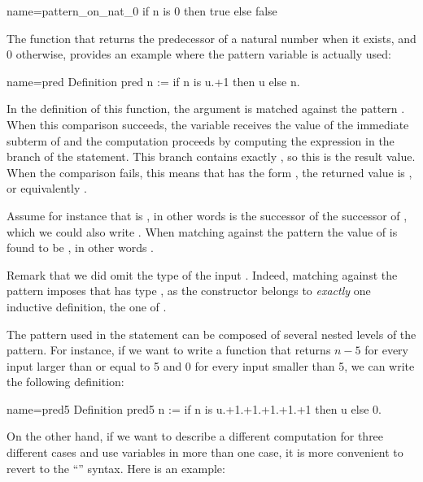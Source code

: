\begin{coq}{name=pattern_on_nat_0}{}
if n is 0 then true else false
\end{coq}

The  function that returns the predecessor of a natural number
when it exists, and 0 otherwise, provides an example where the pattern
variable is actually used:

\begin{coq}{name=pred}{}
Definition pred n := if n is u.+1 then u else n.
\end{coq}

In the definition of this function, the argument  is
matched against the pattern .  When this comparison
succeeds, the variable  receives the value of the immediate
subterm of  and the computation proceeds by computing the expression
in the  branch of the  statement.  This branch contains
exactly , so this is the result value.  When the comparison
fails, this means that  has the form , the returned value is
, or equivalently .

Assume for instance that  is , in other words  is the
successor of the successor of , which we could also write
.  When matching  against the pattern 
the value of  is found to be , in other words .

Remark that we did omit the type of the input . Indeed, matching
 against  the  pattern imposes that  has type
, as the  constructor belongs to \emph{exactly}
one inductive definition, the one of .

The pattern used in the  statement can be composed of
several nested levels of the  pattern.  For instance,
if we want to write a function
that returns \(n-5\) for every input larger than or equal to 5 and 0
for every input smaller than 5, we can write the following definition:

\begin{coq}{name=pred5}{}
Definition pred5 n :=
  if n is u.+1.+1.+1.+1.+1 then u else 0.
\end{coq}
On the other hand, if we want to describe a different computation for
three different cases and use variables in more than one case, it is
more convenient
to revert to the ``'' syntax.  Here is an
example:


